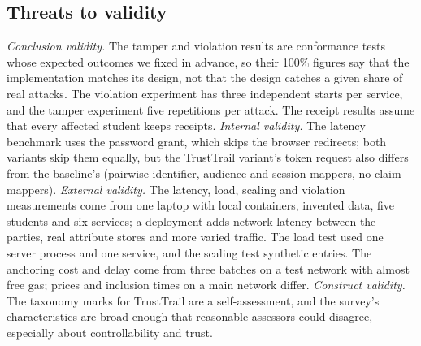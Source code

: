 \subsection{Threats to validity}
\emph{Conclusion validity.} The tamper and violation results are conformance tests whose expected outcomes we fixed in advance, so their 100\% figures say that the implementation matches its design, not that the design catches a given share of real attacks. The violation experiment has three independent starts per service, and the tamper experiment five repetitions per attack. The receipt results assume that every affected student keeps receipts. \emph{Internal validity.} The latency benchmark uses the password grant, which skips the browser redirects; both variants skip them equally, but the TrustTrail variant's token request also differs from the baseline's (pairwise identifier, audience and session mappers, no claim mappers). \emph{External validity.} The latency, load, scaling and violation measurements come from one laptop with local containers, invented data, five students and six services; a deployment adds network latency between the parties, real attribute stores and more varied traffic. The load test used one server process and one service, and the scaling test synthetic entries. The anchoring cost and delay come from three batches on a test network with almost free gas; prices and inclusion times on a main network differ. \emph{Construct validity.} The taxonomy marks for TrustTrail are a self-assessment, and the survey's characteristics are broad enough that reasonable assessors could disagree, especially about controllability and trust.
